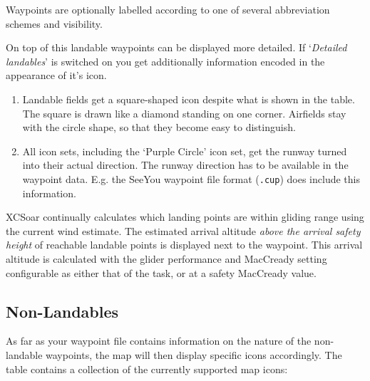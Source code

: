 Waypoints are optionally labelled according to one of several
abbreviation schemes  and visibility.

On top of this landable waypoints can be displayed more detailed. If
`{\it Detailed landables}' is switched on you get additionally information
encoded in the appearance of it's icon.
\begin{enumerate}
\item  Landable fields get a square-shaped icon despite what is shown in the table.
  The square is drawn like a diamond standing on one corner. Airfields stay with the
  circle shape, so that they become easy to distinguish.
\item  All icon sets, including the `Purple Circle' icon set, get the
  runway turned into their actual direction. The runway direction has to be available in
  the waypoint data. E.g. the SeeYou waypoint file format (\verb|.cup|) does
  include this information.
\end{enumerate}

XCSoar continually calculates which landing points are within gliding
range using the current wind estimate.  The estimated arrival altitude
{\em above the arrival safety height} of reachable landable points is
displayed next to the waypoint.  This arrival altitude is calculated
with the glider performance and MacCready setting configurable as
either that of the task, or at a safety MacCready value.

\subsection*{Non-Landables}
As far as your waypoint file contains information on the nature of the
non-landable waypoints, the map will then display specific icons accordingly.
The table contains a collection of the currently supported map icons:

